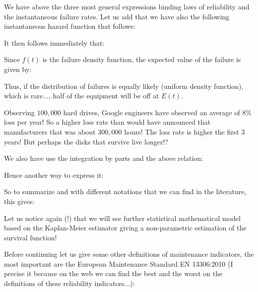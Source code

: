 	We have above the three most general expressions binding laws of reliability and the instantaneous failure rates. Let us add that we have also the following instantaneous hazard function that follows:
	
	It then follows immediately that:
	
	Since $f (t)$ is the failure density function, the expected value of the failure is given by:
	
	Thus, if the distribution of failures is equally likely (uniform density function), which is rare..., half of the equipment will be off at $E(t)$.
	
	\begin{tcolorbox}[title=Remark,colframe=black,arc=10pt]
	Observing $100,000$ hard drives, Google engineers have observed an average of $8\%$ loss per year! So a higher loss rate than would have announced that manufacturers that was about $300,000$ hours! The loss rate is higher the first $3$ years! But perhaps the disks that survive live longer!?
	\end{tcolorbox}
	We also have use the integration by parts and the above relation:
	
	Hence another way to express it:
	
	So to summarize and with different notations that we can find in the literature, this gives:
	\setlength\extrarowheight{12pt}
	
	\setlength\extrarowheight{0pt}
	Let us notice again (!) that we will see further statistical mathematical model based on the Kaplan-Meier estimator giving a non-parametric estimation of the survival function!
	
	Before continuing let us give some other definitions of maintenance indicators, the most important are the European Maintenance Standard EN 13306:2010 (I precise it because on the web we can find the best and the worst on the definitions of these reliability indicators...):
	
